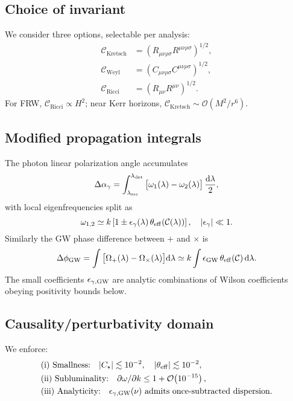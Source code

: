 \documentclass[%
 reprint,
 amsmath,amssymb,
 aps,
 pra,
 longbibliography,
 nofootinbib
]{revtex4-2}
\newcommand{\Ord}[1]{\mathcal{O}\!\left(#1\right)}
\newcommand{\dd}{\mathrm{d}}
\begin{document}
\subsection{Choice of invariant}
\label{sec:invariants}
We consider three options, selectable per analysis:
\begin{align}
\mathcal{C}_\text{Kretsch} &= \left(R_{\mu\nu\rho\sigma}R^{\mu\nu\rho\sigma}\right)^{1/2},\\
\mathcal{C}_\text{Weyl} &= \left(C_{\mu\nu\rho\sigma}C^{\mu\nu\rho\sigma}\right)^{1/2},\\
\mathcal{C}_\text{Ricci} &= \left(R_{\mu\nu}R^{\mu\nu}\right)^{1/2}.
\end{align}
For FRW, $\mathcal{C}_\text{Ricci}\propto H^2$; near Kerr horizons, $\mathcal{C}_\text{Kretsch}\sim \Ord{M^2/r^6}$.

\subsection{Modified propagation integrals}
\label{sec:propagation}
The photon linear polarization angle accumulates
\begin{equation}
\Delta\alpha_\gamma = \int_{\lambda_{\rm src}}^{\lambda_{\rm det}}
\big[\omega_1(\lambda)-\omega_2(\lambda)\big]\,
\frac{\dd \lambda}{2},
\end{equation}
with local eigenfrequencies split as
\begin{equation}
\omega_{1,2} \simeq k\left[1 \pm \epsilon_\gamma(\lambda)\,\theta_{\rm eff}(\mathcal{C}(\lambda))\right],
\quad |\epsilon_\gamma|\ll 1.
\label{eq:photon-split}
\end{equation}
Similarly the GW phase difference between $+$ and $\times$ is
\begin{equation}
\Delta\phi_{\rm GW}
=\int \big[\Omega_+(\lambda)-\Omega_\times(\lambda)\big]\dd \lambda
\simeq k\int \epsilon_{\rm GW}\,\theta_{\rm eff}(\mathcal{C})\,\dd \lambda.
\end{equation}
The small coefficients $\epsilon_{\gamma,{\rm GW}}$ are analytic combinations of Wilson coefficients obeying positivity bounds below.

\subsection{Causality/perturbativity domain}
\label{sec:domain}
We enforce:
\begin{align}
&\text{(i) Smallness:}\quad |C_\star|\lesssim 10^{-2},\quad
|\theta_{\rm eff}|\lesssim 10^{-2},\\
&\text{(ii) Subluminality:}\quad
\partial \omega/\partial k \le 1 + \Ord{10^{-15}},\\
&\text{(iii) Analyticity:}\quad
\epsilon_{\gamma,\rm GW}(\nu)\ \text{admits once-subtracted dispersion.}
\end{align}
\end{document}
